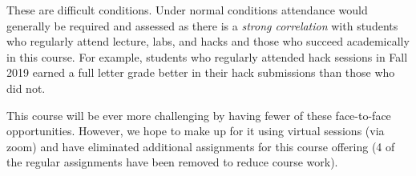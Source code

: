\documentclass[12pt]{scrartcl}
\begin{document}
\begin{itemize}
\end{itemize}

These are difficult conditions.  Under normal conditions attendance
would generally be required and assessed as there is a 
\emph{strong correlation} with students who regularly 
attend lecture, labs, and hacks and those who succeed academically
in this course.  For example, students who regularly attended hack
sessions in Fall 2019 earned a full letter grade better in their
hack submissions than those who did not.  

This course will be ever more challenging by having fewer of these
face-to-face opportunities.  However, we hope to make up for it using
virtual sessions (via zoom) and have eliminated additional assignments
for this course offering (4 of the regular assignments have been removed
to reduce course work).  


%
\end{document}
